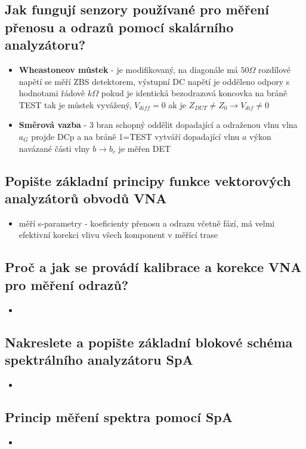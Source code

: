 \documentclass[a4paper]{article}
\begin{document}
\subsection{\textbf{Jak fungují senzory používané pro měření přenosu a odrazů pomocí skalárního analyzátoru? }}
\begin{itemize}
	\item \textbf{Wheastoneov můstek} - je modifikovaný, na diagonále má $50 \Omega$
	\subitem rozdílové napětí se měří ZBS detektorem, výstupní DC napětí je odděleno odpory s hodnotami řádově $k\Omega$
	\subitem pokud je identická bezodrazová koncovka na bráně TEST tak je můstek vyvážený, $V_{diff}=0$
	\subitem ak je $Z_{DUT}\neq Z_0 \to V_{dif}\neq 0$
	\item \textbf{Směrová vazba} - 3 bran schopný oddělit dopadající a odraženou vlnu
	\subitem vlna $a_G$ projde DCp a na bráně 1=TEST vytváří dopadající vlnu $a$
	\subitem výkon navázané části vlny $b \to b_c$ je měřen DET
\end{itemize}
\subsection{\textbf{Popište základní principy funkce vektorových analyzátorů obvodů VNA}}
\begin{itemize}
	\item měří s-parametry - koeficienty přenosu a odrazu včetně fází, má velmi efektivní korekci vlivu všech komponent v měřící trase
\end{itemize}
\subsection{\textbf{Proč a jak se provádí kalibrace a korekce VNA pro měření odrazů?}}
\begin{itemize}
	\item
\end{itemize}
\subsection{\textbf{Nakreslete a popište základní blokové schéma spektrálního analyzátoru SpA}}
\begin{itemize}
	\item
\end{itemize}
\subsection{\textbf{Princip měření spektra pomocí SpA}}
\begin{itemize}
	\item
\end{itemize}
\end{document}
